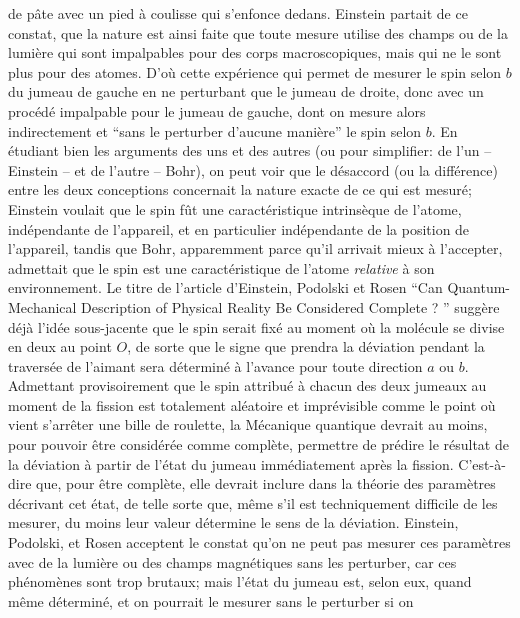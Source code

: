 de p\^ate avec un pied \`a coulisse qui s'enfonce dedans. Einstein partait 
de ce constat, que la nature est ainsi faite que toute mesure utilise des 
champs ou de la lumi\`ere qui sont impalpables pour des corps 
macroscopiques, mais qui ne le sont plus pour des atomes. D'o\`u cette 
exp\'erience qui permet de mesurer le spin selon $b$ du jumeau de  
gauche en ne perturbant que le jumeau de droite, donc avec un proc\'ed\'e
impalpable pour le jumeau de gauche, dont on mesure alors indirectement et
``sans le perturber d'aucune mani\`ere'' le spin selon $b$.  
\medskip 
En \'etudiant bien les arguments des uns et des autres (ou pour  
simplifier:  de l'un -- Einstein --  et de l'autre -- Bohr), on peut voir que 
le d\'esaccord (ou la diff\'erence) entre les deux conceptions concernait 
la nature exacte de ce qui est mesur\'e; Einstein voulait que le spin f\^ut  
une caract\'eristique intrins\`eque de l'atome, ind\'ependante de  
l'appareil, et en particulier ind\'ependante de la position de l'appareil, 
tandis que Bohr, apparemment parce qu'il arrivait mieux \`a l'accepter, 
admettait que le spin est une caract\'eristique de l'atome {\it relative} 
\`a son environnement. Le titre de l'article d'Einstein, Podolski et Rosen 
``Can Quantum-Mechanical Description of Physical Reality Be Considered 
Complete ? '' sugg\`ere d\'ej\`a l'id\'ee sous-jacente que le spin serait 
fix\'e au moment o\`u la mol\'ecule se divise en deux au point $O$, de 
sorte que le signe que prendra la d\'eviation pendant la travers\'ee de 
l'aimant sera d\'etermin\'e \`a l'avance pour toute direction $a$ ou $b$. 
Admettant provisoirement que le spin attribu\'e \`a chacun des deux 
jumeaux au moment de la fission est totalement al\'eatoire et 
impr\'evisible comme le point o\`u vient s'arr\^eter une bille de roulette, 
la M\'ecanique quantique devrait au moins, pour pouvoir \^etre 
consid\'er\'ee  comme compl\`ete, per\-met\-tre de pr\'edire le  
r\'esultat de la  d\'eviation \`a partir de l'\'etat du jumeau 
imm\'ediatement  apr\`es la fission. C'est-\`a-dire que, pour \^etre 
compl\`ete, elle devrait inclure dans la th\'eorie des param\`etres 
d\'ecrivant cet \'etat, de telle sorte que, m\^eme s'il est techniquement 
difficile de les mesurer, du moins leur valeur d\'etermine le sens de la 
d\'eviation. Einstein, Podolski, et Rosen acceptent le constat qu'on ne 
peut pas mesurer ces param\`etres  avec de la  lumi\`ere ou des champs 
magn\'etiques sans  les perturber,  car ces ph\'enom\`enes sont trop 
brutaux; mais l'\'etat du jumeau est, selon eux, quand m\^eme 
d\'etermin\'e, et on pourrait le mesurer sans le perturber si on 
